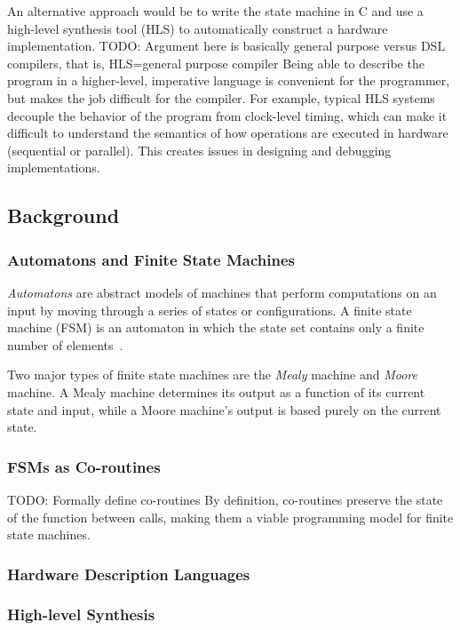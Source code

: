 \documentclass{article}
\newcommand{\TODO}[1]{}
\renewcommand{\TODO}[1]{{\color{red} TODO: {#1}}}
\begin{document}
An alternative approach would be to write the state machine in C and
use a high-level synthesis tool (HLS) to automatically construct a
hardware implementation. \TODO{Argument here is basically general
purpose versus DSL compilers, that is, HLS=general purpose compiler} 
Being able to describe the program in a higher-level, imperative
language is convenient for the programmer, but makes the job difficult
for the compiler. For example, typical HLS systems decouple the
behavior of the program from clock-level timing, which can make it
difficult to understand the semantics of how operations are executed in
hardware (sequential or parallel). This creates issues in designing and debugging implementations.

\subsection{Background}
\subsubsection{Automatons and Finite State Machines}
\emph{Automatons} are abstract models of machines that perform
computations on an input by moving through a series of states or
configurations. A finite state machine (FSM) is an automaton in which
the state set contains only a finite number of
elements~\cite{basics-of-automata-theory}.

Two major types of finite state machines are the \emph{Mealy} machine
and \emph{Moore} machine. A Mealy machine determines its output as a function of its current state and input, while a Moore machine's output is based purely on the current state.
\subsubsection{FSMs as Co-routines}
\label{sec:fsms_as_coroutines}
\TODO{Formally define co-routines}
By definition, co-routines preserve the state of the function between calls,
making them a viable programming model for finite state machines.

\subsubsection{Hardware Description Languages}
\subsubsection{High-level Synthesis}
\end{document}
